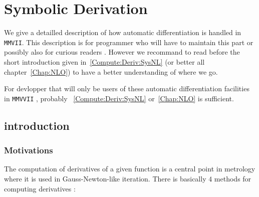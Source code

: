 \chapter{Symbolic Derivation}

We give a detailled description of how automatic differentiation is handled in {\tt MMVII}.
This description is for programmer who will have to maintain this part or possibly also for curious readers .
However we recommand to read before the short introduction given in~\ref{Compute:Deriv:SysNL} (or better all chapter~\ref{Chap:NLO}) to
have a better understanding of where we go.

For devlopper that will only be users of these  automatic differentiation facilities in {\tt MMVVII} , probably
~\ref{Compute:Deriv:SysNL} or~\ref{Chap:NLO} is sufficient.



\section{introduction}


\subsection{Motivations}

The computation of derivatives of a given function is a central point in metrology
where it is used in Gauss-Newton-like iteration.  There is basically $4$ methods
for computing derivatives :

